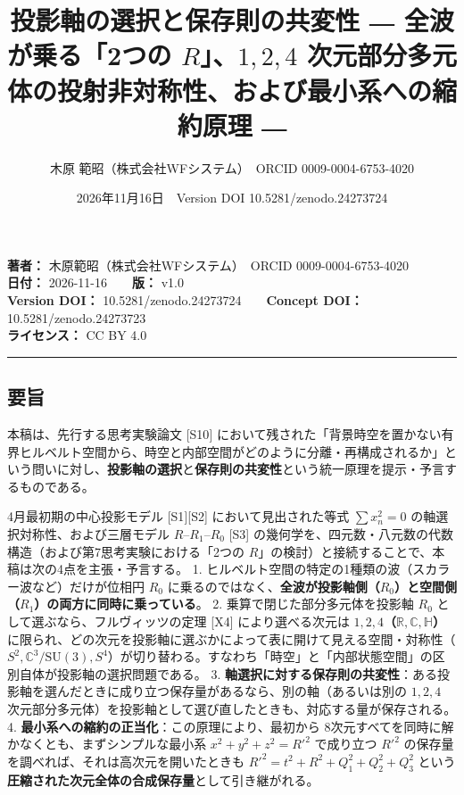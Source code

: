 \documentclass[
  a4paper,
]{ltjsarticle}
\title{投影軸の選択と保存則の共変性 ― 全波が乗る「2つの
\(R\)」、\(1, 2, 4\)
次元部分多元体の投射非対称性、および最小系への縮約原理 ―}
\author{木原 範昭（株式会社WFシステム）　ORCID 0009-0004-6753-4020}
\date{2026年11月16日　Version DOI 10.5281/zenodo.24273724}
\begin{document}
\maketitle

\textbf{著者：} 木原範昭（株式会社WFシステム）　ORCID
0009-0004-6753-4020\\
\textbf{日付：} 2026-11-16　　\textbf{版：} v1.0\\
\textbf{Version DOI：} 10.5281/zenodo.24273724　　\textbf{Concept DOI：}
10.5281/zenodo.24273723\\
\textbf{ライセンス：} CC BY 4.0\\

\begin{center}\rule{0.5\linewidth}{0.5pt}\end{center}

\subsection{要旨}\label{ux8981ux65e8}

本稿は、先行する思考実験論文 {[}S10{]}
において残された「背景時空を置かない有界ヒルベルト空間から、時空と内部空間がどのように分離・再構成されるか」という問いに対し、\textbf{投影軸の選択}と\textbf{保存則の共変性}という統一原理を提示・予言するものである。

4月最初期の中心投影モデル {[}S1{]}{[}S2{]} において見出された等式
\(\sum x_n^2 = 0\) の軸選択対称性、および三層モデル
\(R\)--\(R_1\)--\(R_0\) {[}S3{]}
の幾何学を、四元数・八元数の代数構造（および第7思考実験における「2つの
\(R\)」の検討）と接続することで、本稿は次の4点を主張・予言する。 1.
ヒルベルト空間の特定の1種類の波（スカラー波など）だけが位相円 \(R_0\)
に乗るのではなく、\textbf{全波が投影軸側（\(R_0\)）と空間側（\(R_1\)）の両方に同時に乗っている}。
2. 乗算で閉じた部分多元体を投影軸 \(R_0\)
として選ぶなら、フルヴィッツの定理 {[}X4{]} により選べる次元は
\textbf{\(1, 2, 4\)（\(\mathbb{R}, \mathbb{C}, \mathbb{H}\)）}
に限られ、どの次元を投影軸に選ぶかによって表に開けて見える空間・対称性（\(S^2, \mathbb{C}^3/\mathrm{SU}(3), S^4\)）が切り替わる。すなわち「時空」と「内部状態空間」の区別自体が投影軸の選択問題である。
3.
\textbf{軸選択に対する保存則の共変性}：ある投影軸を選んだときに成り立つ保存量があるなら、別の軸（あるいは別の
\(1, 2, 4\)
次元部分多元体）を投影軸として選び直したときも、対応する量が保存される。
4. \textbf{最小系への縮約の正当化}：この原理により、最初から
8次元すべてを同時に解かなくとも、まずシンプルな最小系
\(x^2 + y^2 + z^2 = R'^2\) で成り立つ \(R'^2\)
の保存量を調べれば、それは高次元を開いたときも
\(R'^2 = t^2 + R^2 + Q_1^2 + Q_2^2 + Q_3^2\)
という\textbf{圧縮された次元全体の合成保存量}として引き継がれる。
\end{document}

